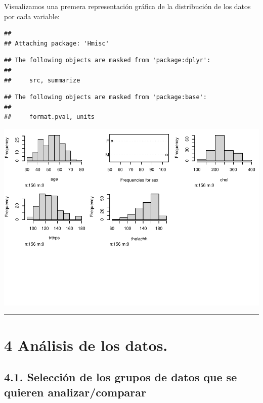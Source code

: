 \documentclass[
]{article}
\begin{document}
Visualizamos una premera representación gráfica de la distribución de
los datos por cada variable:

\begin{verbatim}
## 
## Attaching package: 'Hmisc'
\end{verbatim}

\begin{verbatim}
## The following objects are masked from 'package:dplyr':
## 
##     src, summarize
\end{verbatim}

\begin{verbatim}
## The following objects are masked from 'package:base':
## 
##     format.pval, units
\end{verbatim}

\includegraphics{PRA2_files/figure-latex/unnamed-chunk-10-1.pdf}

\begin{center}\rule{0.5\linewidth}{0.5pt}\end{center}

\hypertarget{anuxe1lisis-de-los-datos.}{%
\section{4 Análisis de los datos.}\label{anuxe1lisis-de-los-datos.}}

\hypertarget{selecciuxf3n-de-los-grupos-de-datos-que-se-quieren-analizarcomparar}{%
\subsection{4.1. Selección de los grupos de datos que se quieren
analizar/comparar}\label{selecciuxf3n-de-los-grupos-de-datos-que-se-quieren-analizarcomparar}}
\end{document}
